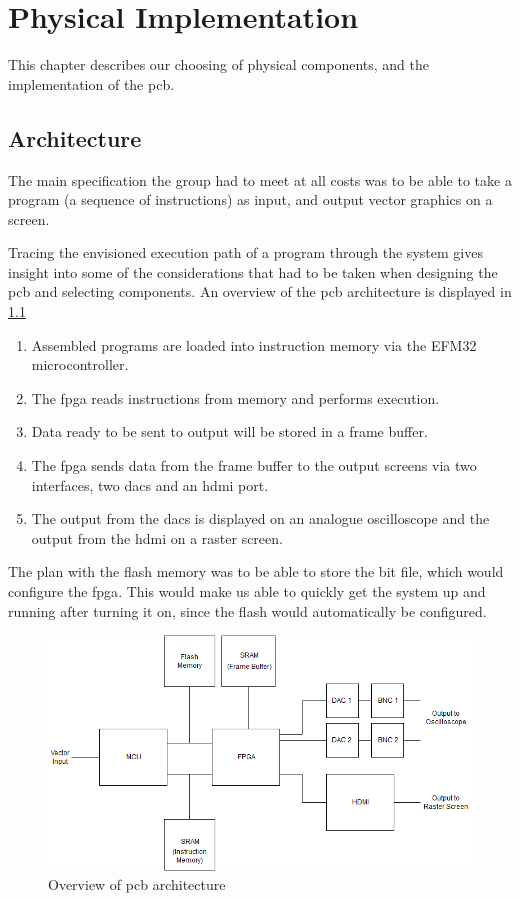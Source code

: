 \chapter{Physical Implementation}

This chapter describes our choosing of physical components, and the implementation of the \gls{pcb}.

\section{Architecture}
The main specification the group had to meet at all costs was to be able to take a program (a sequence of instructions) as input, and output vector graphics on a screen.

Tracing the envisioned execution path of a program through the system gives insight into some of the considerations that had to be taken when designing the \gls{pcb} and selecting components. An overview of the \gls{pcb} architecture is displayed in \ref{fig:PCB_Overview}

\begin{enumerate}
\item Assembled \vthreek programs are loaded into instruction memory via the EFM32 microcontroller.
\item The \gls{fpga} reads instructions from memory and performs execution.
\item Data ready to be sent to output will be stored in a frame buffer.
\item The \gls{fpga} sends data from the frame buffer to the output screens via two interfaces, two \gls{dac}s and an \gls{hdmi} port.
\item The output from the \gls{dac}s is displayed on an analogue oscilloscope and the output from the \gls{hdmi} on a raster screen.
\end{enumerate}

The plan with the flash memory was to be able to store the bit file, which would configure the \gls{fpga}. This would make us able to quickly get the system up and running after turning it on, since the flash would automatically be configured.

\begin{figure}[h!]
\centering
\includegraphics[scale = 0.4]{images/PCB_Overview.png}
\caption{Overview of \gls{pcb} architecture}
\label{fig:PCB_Overview}
\end{figure}

